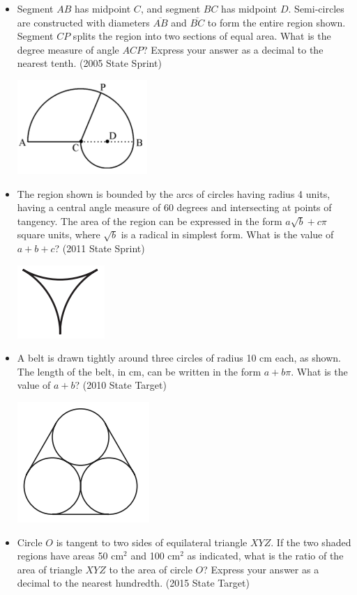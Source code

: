 \documentclass{article}
\begin{document}
\begin{itemize}
\item Segment $AB$ has midpoint $C$, and segment $BC$ has midpoint $D$. Semi-circles are constructed with diameters $\overline{AB}$ and $\overline{BC}$ to form the entire region shown. Segment $CP$ splits the region into two sections of equal area. What is the degree measure of angle $ACP$? Express your answer as a decimal to the nearest tenth. (2005 State Sprint)

\centerline{\includegraphics{200530.png}}

\item The region shown is bounded by the arcs of circles having radius 4 units, having a central angle measure of 60 degrees and intersecting at points of tangency. The area of the region can be expressed in the form $a\sqrt{b}+c\pi$ square units, where $\sqrt{b}$ is a radical in simplest form. What is the value of $a+b+c$? (2011 State Sprint)

\centerline{\includegraphics{201128.png}}

\item A belt is drawn tightly around three circles of radius 10 cm each, as shown. The length of the belt, in cm, can be written in the form $a+b\pi$. What is the value of $a+b$? (2010 State Target)

\centerline{\includegraphics{20108.png}}

\item Circle $O$ is tangent to two sides of equilateral triangle $XYZ$. If the two shaded regions have areas 50 $\text{cm}^2$ and 100 $\text{cm}^2$ as indicated, what is the ratio of the area of triangle $XYZ$ to the area of circle $O$? Express your answer as a decimal to the nearest hundredth. (2015 State Target)


\end{itemize}
\end{document}
